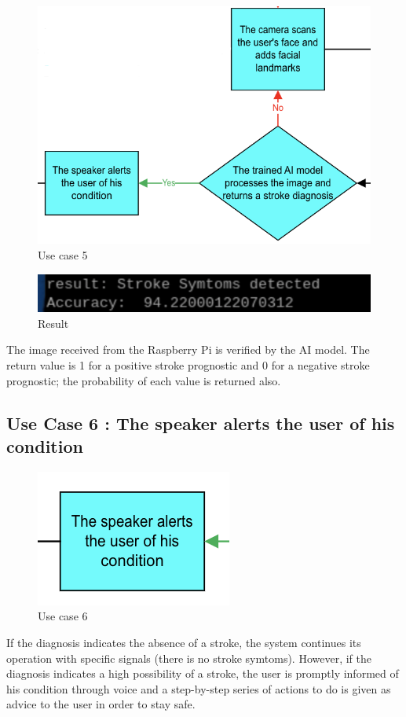 \begin{figure}[H]
    \centering
    \includegraphics[width=0.7\linewidth]{images/use_case5.png}
    \caption{Use case 5}
    \label{fig:use_case5}
\end{figure}

\begin{figure}[H]
    \centering
    \includegraphics[width=1\linewidth]{images/Result.png}
    \caption{Result}
    \label{fig:result}
\end{figure}

The image received from the Raspberry Pi is verified by the AI model. The return value is 1 for a positive stroke prognostic and 0 for a negative stroke prognostic; the probability of each value is returned also.

\subsection{\textbf{Use Case 6 : The speaker alerts the user of his condition}}

\begin{figure}[H]
    \centering
    \includegraphics[width=0.33\linewidth]{images/use_case6.png}
    \caption{Use case 6}
    \label{fig:use_case6}
\end{figure}

If the diagnosis indicates the absence of a stroke, the system continues its operation with specific signals (there is no stroke symtoms). However, if the diagnosis indicates a high possibility of a stroke, the user is promptly informed of his condition through voice and a step-by-step series of actions to do is given as advice to the user in order to stay safe.